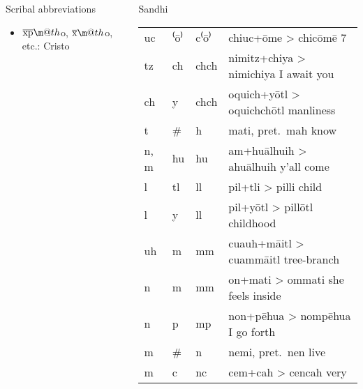 \documentclass[12pt]{beamer}
\makeatletter
\newcommand*{\textoverline}[1]{$\overline{\hbox{#1}}\m@th$}
\newcommand{\nah}[1]{\textcolor{nahgrn}{#1}}
\newcommand{\trs}[1]{\textcolor{nahblu}{#1}}
\makeatother
\begin{document}
\begin{frame}
\begin{columns}[t]
\begin{column}{.23\linewidth}
\begin{block}{Scribal abbreviations}
\begin{multicols}{2}
\begin{itemize}
            \item \nah{\textoverline{xp}o, \textoverline{x}o}, etc.: \nah{Cristo}
          \end{itemize}
        \end{multicols}
      \end{block}
    \end{column}
    \begin{column}{.26\linewidth}
      \begin{block}{Sandhi}
        \begin{threeparttable}
          \begin{tabular}{l@{+ }l@{> }ll}
            \nah{uc}   & \nah{⁽ō⁾} & \nah{c⁽ō⁾}            & \nah{chiuc}+\nah{ōme} > \nah{chicōmē} \trs{7}                   \\
            \nah{tz}   & \nah{ch}  & \nah{chch}\tnote{1}   & \nah{nimitz}+\nah{chiya} > \nah{nimichiya} \trs{I await you}    \\
            \nah{ch}   & \nah{y}   & \nah{chch}\tnote{1}   & \nah{oquich}+\nah{yōtl} > \nah{oquichchōtl} \trs{manliness}     \\
            \nah{t}    & \nah{\#}  & \nah{h}               & \nah{mati}, pret.~\nah{mah} \trs{know}                          \\
            \nah{n, m} & \nah{hu}  & \nah{hu}              & \nah{am}+\nah{huālhuih} > \nah{ahuālhuih} \trs{y'all come}      \\
            \nah{l}    & \nah{tl}  & \nah{ll}              & \nah{pil}+\nah{tli} > \nah{pilli} \trs{child}                   \\
            \nah{l}    & \nah{y}   & \nah{ll}              & \nah{pil}+\nah{yōtl} > \nah{pillōtl} \trs{childhood}            \\
            \nah{uh}   & \nah{m}   & \nah{mm}              & \nah{cuauh}+\nah{māitl} > \nah{cuammāitl} \trs{tree-branch}     \\
            \nah{n}    & \nah{m}   & \nah{mm}              & \nah{on}+\nah{mati} > \nah{ommati} \trs{she feels inside}       \\
            \nah{n}    & \nah{p}   & \nah{mp}              & \nah{non}+\nah{pēhua} > \nah{nompēhua} \trs{I go forth}         \\
            \nah{m}    & \nah{\#}  & \nah{n}               & \nah{nemi}, pret.~\nah{nen} \trs{live}                          \\
            \nah{m}    & \nah{c}   & \nah{nc}              & \nah{cem}+\nah{cah} > \nah{cencah} \trs{very}                   \\

\end{tabular}
\end{threeparttable}
\end{block}
\end{column}
\end{columns}
\end{frame}
\end{document}
